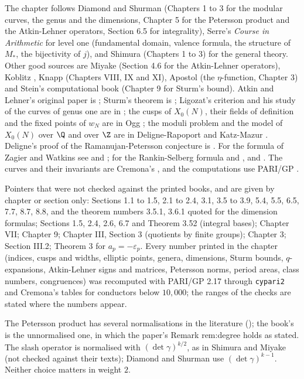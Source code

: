 The chapter follows Diamond and Shurman \cite{DiamondShurman} (Chapters 1 to 3 for the modular curves, the genus and the dimensions, Chapter 5 for the Petersson product and
the Atkin-Lehner operators, Section 6.5 for integrality), Serre's \emph{Course in Arithmetic} \cite[Chapter VII]{SerreCourse} for level one (fundamental domain, valence formula,
the structure of $M_*$, the bijectivity of $j$), and Shimura \cite{Shimura71} (Chapters 1 to 3) for the general theory. Other good sources are Miyake \cite{Miyake} (Section 4.6 for
the Atkin-Lehner operators), Koblitz \cite[Chapter III]{Koblitz}, Knapp \cite{Knapp} (Chapters VIII, IX and XI), Apostol \cite{Apostol90} (the $\eta$-function, Chapter 3) and Stein's
computational book \cite{Stein} (Chapter 9 for Sturm's bound). Atkin and Lehner's original paper is \cite{AtkinLehner70}; Sturm's theorem is \cite{Sturm87}; Ligozat's criterion
and his study of the curves of genus one are in \cite{Ligozat75}; the cusps of $X_0(N)$, their fields of definition and the fixed points of $w_N$ are in Ogg \cite{Ogg73}; the moduli
problem and the model of $X_0(N)$ over $\Q$ and over $\Z$ are in Deligne-Rapoport \cite{DeligneRapoport73} and Katz-Mazur \cite{KatzMazur85}. Deligne's proof of the
Ramanujan-Petersson conjecture is \cite{Deligne}. For the formula of Zagier and Watkins see \cite{Zagier85,Watkins02} and ; for the Rankin-Selberg formula
\cite{Rankin39,Shimura76} and \cite[Lemma 2.12]{DFG04}, and . The curves and their invariants are Cremona's \cite{Cremona97}, and the computations use
PARI/GP \cite{PARI}.

Pointers that were not checked against the printed books, and are given by chapter or section only: \cite{DiamondShurman} Sections 1.1 to 1.5, 2.1 to 2.4, 3.1, 3.5 to 3.9,
5.4, 5.5, 6.5, 7.7, 8.7, 8.8, and the theorem numbers 3.5.1, 3.6.1 quoted for the dimension formulas; \cite{Shimura71} Sections 1.5, 2.4, 2.6, 6.7 and Theorem 3.52 (integral bases);
\cite{SerreCourse} Chapter VII; \cite{Stein} Chapter 9; \cite{Miranda} Chapter III, Section 3 (quotients by finite groups); \cite{Apostol90} Chapter 3; \cite{Koblitz} Section III.2;
\cite{AtkinLehner70} Theorem 3 for $a_p=-\varepsilon_p$. Every number printed in the chapter (indices, cusps and widths, elliptic points, genera, dimensions, Sturm bounds, $q$-expansions,
Atkin-Lehner signs and matrices, Petersson norms, period areas, class numbers, congruences) was recomputed with PARI/GP 2.17 through \texttt{cypari2} and Cremona's tables for
conductors below $10{,}000$; the ranges of the checks are stated where the numbers appear.

The Petersson product has several normalisations in the literature (); the book's is the unnormalised one, in which the
paper's Remark rem:degree holds as stated. The slash operator is normalised with $(\det\gamma)^{k/2}$, as in Shimura \cite{Shimura71} and Miyake \cite{Miyake} (not checked against
their texts); Diamond and Shurman use $(\det\gamma)^{k-1}$. Neither choice matters in weight $2$.
